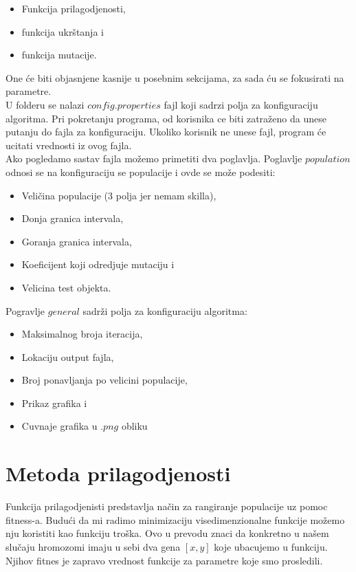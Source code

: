 \documentclass[a4paper,11pt]{book}
\begin{document}
\begin{itemize}
  \item Funkcija prilagodjenosti,
  \item funkcija ukrštanja i
  \item funkcija mutacije. 
\end{itemize}

One će biti objasnjene kasnije u posebnim sekcijama, za sada ću se fokusirati na parametre.\\

U folderu se nalazi $config.properties$ fajl koji sadrzi polja za konfiguraciju algoritma. Pri pokretanju programa, od korisnika ce biti zatraženo da unese putanju do fajla za konfiguraciju. Ukoliko korisnik ne unese fajl, program će ucitati vrednosti iz ovog fajla. \\

Ako pogledamo sastav fajla možemo primetiti dva poglavlja. Poglavlje $population$ odnosi se na konfiguraciju se populacije i ovde se može podesiti:

\begin{itemize}
  \item Veličina populacije (3 polja jer nemam skilla),
  \item Donja granica intervala,
  \item Goranja granica intervala,
  \item Koeficijent koji odredjuje mutaciju i 
  \item Velicina test objekta.
\end{itemize}
 
Pogravlje $general$ sadrži polja za konfiguraciju algoritma:
\begin{itemize}
  \item Maksimalnog broja iteracija,
  \item Lokaciju output fajla,
  \item Broj ponavljanja po velicini populacije,
  \item Prikaz grafika i
  \item Cuvnaje grafika u $.png$ obliku
\end{itemize} 

\section{Metoda prilagodjenosti}

Funkcija prilagodjenisti predstavlja način za rangiranje populacije uz pomoc fitness-a. Budući da mi radimo minimizaciju visedimenzionalne funkcije možemo nju koristiti kao funkciju troška. Ovo u prevodu znaci da konkretno u našem slučaju hromozomi imaju u sebi dva gena $[x,y]$ koje ubacujemo u funkciju. Njihov fitnes je zapravo vrednost funkcije za parametre koje smo prosledili.\\
\end{document}
